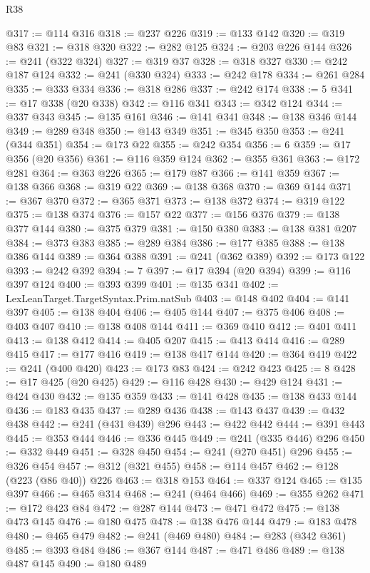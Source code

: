 \begin{lexlean}{R38}
\begin{coremodule}
@317 := @114 @316
@318 := @237 @226
@319 := @133 @142
@320 := @319 @83
@321 := @318 @320
@322 := @282 @125
@324 := @203 @226 @144
@326 := @241 (@322 @324)
@327 := @319 @37
@328 := @318 @327
@330 := @242 @187 @124
@332 := @241 (@330 @324)
@333 := @242 @178
@334 := @261 @284
@335 := @333 @334
@336 := @318 @286
@337 := @242 @174
@338 := 5
@341 := @17 @338 (@20 @338)
@342 := @116 @341
@343 := @342 @124
@344 := @337 @343
@345 := @135 @161
@346 := @141 @341
@348 := @138 @346 @144
@349 := @289 @348
@350 := @143 @349
@351 := @345 @350
@353 := @241 (@344 @351)
@354 := @173 @22
@355 := @242 @354
@356 := 6
@359 := @17 @356 (@20 @356)
@361 := @116 @359 @124
@362 := @355 @361
@363 := @172 @281
@364 := @363 @226
@365 := @179 @87
@366 := @141 @359
@367 := @138 @366
@368 := @319 @22
@369 := @138 @368
@370 := @369 @144
@371 := @367 @370
@372 := @365 @371
@373 := @138 @372
@374 := @319 @122
@375 := @138 @374
@376 := @157 @22
@377 := @156 @376
@379 := @138 @377 @144
@380 := @375 @379
@381 := @150 @380
@383 := @138 @381 @207
@384 := @373 @383
@385 := @289 @384
@386 := @177 @385
@388 := @138 @386 @144
@389 := @364 @388
@391 := @241 (@362 @389)
@392 := @173 @122
@393 := @242 @392
@394 := 7
@397 := @17 @394 (@20 @394)
@399 := @116 @397 @124
@400 := @393 @399
@401 := @135 @341
@402 := LexLeanTarget.TargetSyntax.Prim.natSub
@403 := @148 @402
@404 := @141 @397
@405 := @138 @404
@406 := @405 @144
@407 := @375 @406
@408 := @403 @407
@410 := @138 @408 @144
@411 := @369 @410
@412 := @401 @411
@413 := @138 @412
@414 := @405 @207
@415 := @413 @414
@416 := @289 @415
@417 := @177 @416
@419 := @138 @417 @144
@420 := @364 @419
@422 := @241 (@400 @420)
@423 := @173 @83
@424 := @242 @423
@425 := 8
@428 := @17 @425 (@20 @425)
@429 := @116 @428
@430 := @429 @124
@431 := @424 @430
@432 := @135 @359
@433 := @141 @428
@435 := @138 @433 @144
@436 := @183 @435
@437 := @289 @436
@438 := @143 @437
@439 := @432 @438
@442 := @241 (@431 @439) @296
@443 := @422 @442
@444 := @391 @443
@445 := @353 @444
@446 := @336 @445
@449 := @241 (@335 @446) @296
@450 := @332 @449
@451 := @328 @450
@454 := @241 (@270 @451) @296
@455 := @326 @454
@457 := @312 (@321 @455)
@458 := @114 @457
@462 := @128 (@223 (@86 @40)) @226
@463 := @318 @153
@464 := @337 @124
@465 := @135 @397
@466 := @465 @314
@468 := @241 (@464 @466)
@469 := @355 @262
@471 := @172 @423 @84
@472 := @287 @144
@473 := @471 @472
@475 := @138 @473 @145
@476 := @180 @475
@478 := @138 @476 @144
@479 := @183 @478
@480 := @465 @479
@482 := @241 (@469 @480)
@484 := @283 (@342 @361)
@485 := @393 @484
@486 := @367 @144
@487 := @471 @486
@489 := @138 @487 @145
@490 := @180 @489

\end{coremodule}
\end{lexlean}
